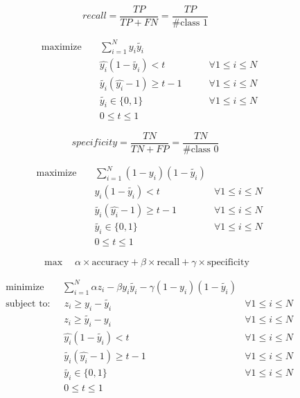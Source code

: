 \documentclass[a4paper]{article}
\begin{document}
\pagebreak

\[
recall = \frac{TP}{TP+FN} = \frac{TP}{\text{\# class 1}}
\]

\begin{equation}
\begin{aligned}
&\text{maximize} \quad \: \: \: \: \sum_{i=1}^{N} y_i \tilde{y_i} \\
& \qquad \qquad \qquad \hat{y_i} (1 - \tilde{y_i}) < t \qquad &\forall 1\le i \le N\\
& \qquad \qquad \qquad  \tilde{y_i} (\hat{y_i} - 1) \ge t - 1 \qquad &\forall 1\le i \le N\\
& \qquad \qquad \qquad \tilde{y_i} \in \{0, 1\} \qquad &\forall 1\le i \le N\\
& \qquad \qquad \qquad 0 \le t \le 1
\end{aligned}
\end{equation}

\pagebreak

\[
specificity = \frac{TN}{TN+FP} = \frac{TN}{\text{\# class 0}}
\]

\begin{equation}
\begin{aligned}
&\text{maximize} \quad \: \: \: \: \sum_{i=1}^{N} (1-y_i) (1-\tilde{y_i}) \\
& \qquad \qquad \qquad \hat{y_i} (1 - \tilde{y_i}) < t \qquad &\forall 1\le i \le N\\
& \qquad \qquad \qquad  \tilde{y_i} (\hat{y_i} - 1) \ge t - 1 \qquad &\forall 1\le i \le N\\
& \qquad \qquad \qquad \tilde{y_i} \in \{0, 1\} \qquad &\forall 1\le i \le N\\
& \qquad \qquad \qquad 0 \le t \le 1
\end{aligned}
\end{equation}

\pagebreak

\[
\max \quad \alpha \times \text{accuracy} + \beta \times \text{recall} + \gamma \times \text{specificity}
\]

\begin{equation}
\begin{aligned}
&\text{minimize} \quad \: \: \: \: \sum_{i=1}^{N} \alpha z_i - \beta y_i\tilde{y_i} - \gamma (1-y_i)(1-\tilde{y_i}) \\
&\text{subject to:} \quad \: \: z_i \ge y_i - \tilde{y_i} \qquad &\forall 1\le i \le N\\
& \qquad \qquad \qquad z_i \ge \tilde{y_i}  - y_i \qquad &\forall 1\le i \le N\\
& \qquad \qquad \qquad \hat{y_i} (1 - \tilde{y_i}) < t \qquad &\forall 1\le i \le N\\
& \qquad \qquad \qquad  \tilde{y_i} (\hat{y_i} - 1) \ge t - 1 \qquad &\forall 1\le i \le N\\
& \qquad \qquad \qquad \tilde{y_i} \in \{0, 1\} \qquad &\forall 1\le i \le N\\
& \qquad \qquad \qquad 0 \le t \le 1
\end{aligned}
\end{equation}
\end{document}
